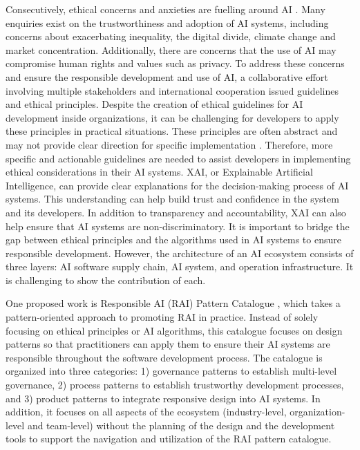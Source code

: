 \documentclass[conference]{IEEEtran}
\begin{document}
Consecutively, ethical concerns and anxieties are fuelling around AI \cite{DBLP}. Many enquiries exist on the trustworthiness and adoption of AI systems, including concerns about exacerbating inequality, the digital divide, climate change and market concentration. Additionally, there are concerns that the use of AI may compromise human rights and values such as privacy. To address these concerns and ensure the responsible development and use of AI, a collaborative effort involving multiple stakeholders and international cooperation issued guidelines and ethical principles. Despite the creation of ethical guidelines for AI development inside organizations, it can be challenging for developers to apply these principles in practical situations. These principles are often abstract and may not provide clear direction for specific implementation \cite{abs-2111-09478}. Therefore, more specific and actionable guidelines are needed to assist developers in implementing ethical considerations in their AI systems. XAI, or Explainable Artificial Intelligence, can provide clear explanations for the decision-making process of AI systems. This understanding can help build trust and confidence in the system and its developers. In addition to transparency and accountability, XAI can also help ensure that AI systems are non-discriminatory. It is important to bridge the gap between ethical principles and the algorithms used in AI systems to ensure responsible development. However, the architecture of an AI ecosystem consists of three layers: AI software supply chain, AI system, and operation infrastructure. It is challenging to show the contribution of each.

One proposed work is Responsible AI (RAI) Pattern Catalogue \cite{catalogue}, which takes a pattern-oriented approach to promoting RAI in practice. Instead of solely focusing on ethical principles or AI algorithms, this catalogue focuses on design patterns so that practitioners can apply them to ensure their AI systems are responsible throughout the software development process. The catalogue is organized into three categories: 1) governance patterns to establish multi-level governance, 2) process patterns to establish trustworthy development processes, and 3) product patterns to integrate responsive design into AI systems. In addition, it focuses on all aspects of the ecosystem (industry-level, organization-level and team-level) without the planning of the design and the development tools to support the navigation and utilization of the RAI pattern catalogue.
\end{document}
